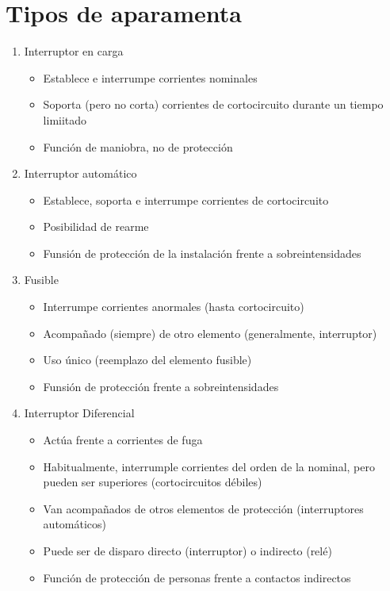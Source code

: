 \section{Tipos de aparamenta}
\begin{enumerate}
    \item Interruptor en carga
    \begin{itemize}
        \item Establece e interrumpe corrientes nominales
        \item Soporta (pero no corta) corrientes de cortocircuito durante un tiempo limiitado
        \item Función de maniobra, no de protección
    \end{itemize}
    \item Interruptor automático
    \begin{itemize}
        \item Establece, soporta e interrumpe corrientes de cortocircuito
        \item Posibilidad de rearme
        \item Funsión de protección de la instalación frente a sobreintensidades
    \end{itemize}
    \item Fusible
    \begin{itemize}
        \item Interrumpe corrientes anormales (hasta cortocircuito)
        \item Acompañado (siempre) de otro elemento (generalmente, interruptor)
        \item Uso único (reemplazo del elemento fusible)
        \item Funsión de protección frente a sobreintensidades
    \end{itemize}
    \item Interruptor Diferencial
    \begin{itemize}
        \item Actúa frente a corrientes de fuga
        \item Habitualmente, interrumple corrientes del orden de la nominal, pero pueden ser superiores (cortocircuitos débiles)
        \item Van acompañados de otros elementos de protección (interruptores automáticos)
        \item Puede ser de disparo directo (interruptor) o indirecto (relé)
        \item Función de protección de personas frente a contactos indirectos
    \end{itemize}
\end{enumerate}

